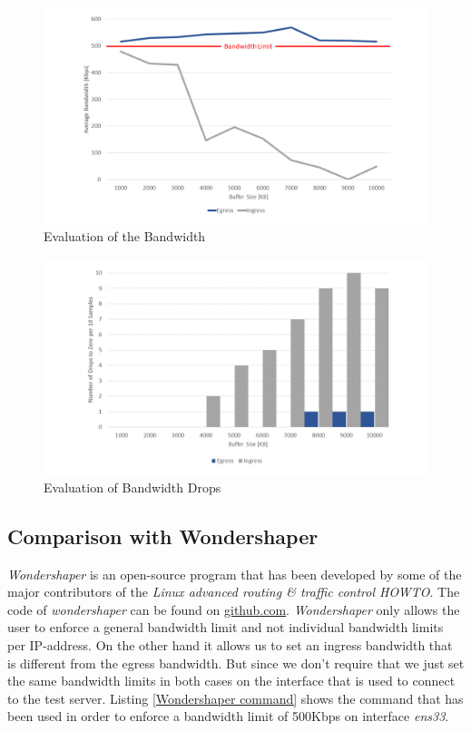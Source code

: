 \begin{figure}[h]
	\centering
	\includegraphics[width=\textwidth]{img/Evaluation-Bandwidth.png}
	\caption{Evaluation of the Bandwidth}
	\label{Evaluation of the Bandwidth}
\end{figure}

\begin{figure}[h]
	\centering
	\includegraphics[width=\textwidth]{img/Evaluation-Zeros.png}
	\caption{Evaluation of Bandwidth Drops}
	\label{Evaluation of the Bandwidth Drops}
\end{figure}
\newpage
\textit{ }
\newpage
\subsection{Comparison with Wondershaper}

\textit{Wondershaper} is an open-source program that has been developed by some of the major contributors of the \textit{Linux advanced routing \& traffic control HOWTO}\cite
{hubert2002linux}. The code of \textit{wondershaper} can be found on \href{https://github.com/magnific0/wondershaper}{github.com}\cite{hubert2002wondershaper}. \textit{Wondershaper} only allows the user to enforce a general bandwidth limit and not individual bandwidth limits per \acs{IP}-address. On the other hand it allows us to set an ingress bandwidth that is different from the egress bandwidth. But since we don't require that we just set the same bandwidth limits in both cases on the interface that is used to connect to the test server. Listing \ref{Wondershaper command} shows the command that has been used in order to enforce a bandwidth limit of 500Kbps on interface \textit{ens33}.

